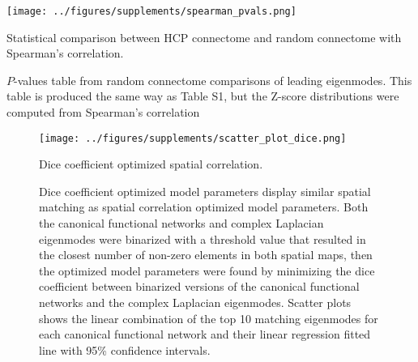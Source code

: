 \begin{table}[ht!]
\centering
\texttt{[image: ../figures/supplements/spearman\_pvals.png]}
\caption{Statistical comparison between HCP connectome and random connectome with Spearman's correlation.}
\caption*{$P$-values table from random connectome comparisons of leading eigenmodes. This table is produced the same way as Table S1, but the Z-score distributions were computed from Spearman's correlation}
\label{tab:S2}
\end{table}

\begin{figure}[ht!]
\centering
\texttt{[image: ../figures/supplements/scatter\_plot\_dice.png]}
\caption{Dice coefficient optimized spatial correlation.}
\caption*{Dice coefficient optimized model parameters display similar spatial matching as spatial correlation optimized model parameters. Both the canonical functional networks and complex Laplacian eigenmodes were binarized with a threshold value that resulted in the closest number of non-zero elements in both spatial maps, then the optimized model parameters were found by minimizing the dice coefficient between binarized versions of the canonical functional networks and the complex Laplacian eigenmodes. Scatter plots shows the linear combination of the top 10 matching eigenmodes for each canonical functional network and their linear regression fitted line with 95\% confidence intervals.}
\label{fig:S3}
\end{figure}